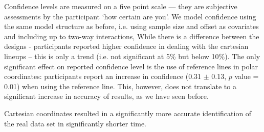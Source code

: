  Confidence levels are measured on a five point scale --- they are subjective assessments by the participant `how certain are you'. We model confidence using the same model structure as before, i.e. using sample size and offset as covariates and including up to two-way interactions,
While there is a difference between the designs - participants reported higher confidence in dealing with the cartesian lineups -- this is only  a trend (i.e. not significant at 5\% but below 10\%). The only significant effect on reported confidence level is the use of reference lines in polar coordinates: participants report an increase in confidence (0.31 $\pm$ 0.13, $p$ value = 0.01) when using the reference line. This, however, does not translate to a significant increase in accuracy of results, as we have seen before.

 Cartesian coordinates resulted in a significantly more accurate identification of the real data set in significantly shorter time.






%




